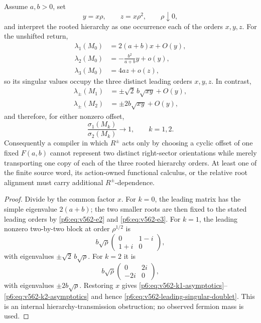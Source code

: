 \documentclass[11pt,a4paper]{article}
\begin{document}
\begin{proposition}
\label{p6:prop:v562-offset-only-hierarchy-obstruction}
Assume \(a,b>0\), set
\[
 y=x\rho,\qquad z=x\rho^2,
\qquad \rho\downarrow0,
\]
and interpret the rooted hierarchy as one occurrence each of the orders
\(x,y,z\).  For the unshifted return,
\begin{align}
 \lambda_1(M_0)&=2(a+b)x+O(y),\nonumber\\
 \lambda_2(M_0)&=-\frac{b^2}{a+b}y+o(y),\label{p6:eq:v562-k0-asymptotics}\\
 \lambda_3(M_0)&=4az+o(z),\nonumber
\end{align}
so its singular values occupy the three distinct leading orders
\(x,y,z\).  In contrast,
\begin{align}
 \lambda_\pm(M_1)&=\pm\sqrt2\,b\sqrt{xy}+O(y),\label{p6:eq:v562-k1-asymptotics}\\
 \lambda_\pm(M_2)&=\pm2b\sqrt{xy}+O(y),\label{p6:eq:v562-k2-asymptotics}
\end{align}
and therefore, for either nonzero offset,
\begin{equation}
\label{p6:eq:v562-leading-singular-doublet}
 \frac{\sigma_1(M_k)}{\sigma_2(M_k)}\longrightarrow1,
 \qquad k=1,2.
\end{equation}
Consequently a compiler in which \(R^\pm\) acts only by choosing a cyclic
offset of one fixed \(F(a,b)\) cannot represent two distinct right-sector
orientations while merely transporting one copy of each of the three rooted
hierarchy orders.  At least one of the finite source word, its action-owned
functional calculus, or the relative root alignment must carry additional
\(R^\pm\)-dependence.
\end{proposition}
\begin{proof}
Divide by the common factor \(x\).  For \(k=0\), the leading matrix has the
simple eigenvalue \(2(a+b)\); the two smaller roots are then fixed to the
stated leading orders by \eqref{p6:eq:v562-e2} and
\eqref{p6:eq:v562-e3}.  For \(k=1\), the leading nonzero two-by-two block at
order \(\rho^{1/2}\) is
\[
 b\sqrt\rho\begin{pmatrix}0&1-i\\1+i&0\end{pmatrix},
\]
with eigenvalues \(\pm\sqrt2\,b\sqrt\rho\).  For \(k=2\) it is
\[
 b\sqrt\rho\begin{pmatrix}0&2i\\-2i&0\end{pmatrix},
\]
with eigenvalues \(\pm2b\sqrt\rho\).  Restoring \(x\) gives
\eqref{p6:eq:v562-k1-asymptotics}--\eqref{p6:eq:v562-k2-asymptotics} and
hence \eqref{p6:eq:v562-leading-singular-doublet}.  This is an internal
hierarchy-transmission obstruction; no observed fermion mass is used.
\end{proof}
\end{document}
